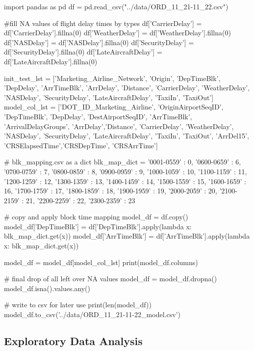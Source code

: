 \documentclass[a4paper,12pt]{article}
\begin{document}
\begin{python}

import pandas as pd
df = pd.read_csv("../data/ORD_11_21-11_22.csv")

#fill NA values of flight delay times by types
df['CarrierDelay'] = df['CarrierDelay'].fillna(0)
df['WeatherDelay'] = df['WeatherDelay'].fillna(0)
df['NASDelay'] = df['NASDelay'].fillna(0)
df['SecurityDelay'] = df['SecurityDelay'].fillna(0)
df['LateAircraftDelay'] = df['LateAircraftDelay'].fillna(0)



init_test_lst = ['Marketing_Airline_Network', 'Origin', 'DepTimeBlk', 'DepDelay', 'ArrTimeBlk',
                 'ArrDelay', 'Distance', 'CarrierDelay', 'WeatherDelay', 'NASDelay', 'SecurityDelay',
                  'LateAircraftDelay', 'TaxiIn', 'TaxiOut']
model_col_lst = ['DOT_ID_Marketing_Airline', 'OriginAirportSeqID', 'DepTimeBlk', 'DepDelay',
'DestAirportSeqID', 'ArrTimeBlk', 'ArrivalDelayGroups', 'ArrDelay','Distance',
'CarrierDelay', 'WeatherDelay', 'NASDelay', 'SecurityDelay', 'LateAircraftDelay',
'TaxiIn', 'TaxiOut', 'ArrDel15', 'CRSElapsedTime','CRSDepTime', 'CRSArrTime']

# blk_mapping.csv as a dict
blk_map_dict ={
    '0001-0559' : 0,
    '0600-0659' : 6,
    '0700-0759' : 7,
    '0800-0859' : 8,
    '0900-0959' : 9,
    '1000-1059' : 10,
    '1100-1159' : 11,
    '1200-1259' : 12,
    '1300-1359' : 13,
    '1400-1459' : 14,
    '1500-1559' : 15,
    '1600-1659' : 16,
    '1700-1759' : 17,
    '1800-1859' : 18,
    '1900-1959' : 19,
    '2000-2059' : 20,
    '2100-2159' : 21,
    '2200-2259' : 22,
    '2300-2359' : 23
}

# copy and apply block time mapping
model_df = df.copy()
model_df['DepTimeBlk'] = df['DepTimeBlk'].apply(lambda x: blk_map_dict.get(x))
model_df['ArrTimeBlk'] = df['ArrTimeBlk'].apply(lambda x: blk_map_dict.get(x))

model_df = model_df[model_col_lst]
print(model_df.columns)

# final drop of all left over NA values
model_df = model_df.dropna()
model_df.isna().values.any()

# write to csv for later use
print(len(model_df))
model_df.to_csv('../data/ORD_11_21-11-22_model.csv')

\end{python}

\subsection{Exploratory Data Analysis}
\end{document}
